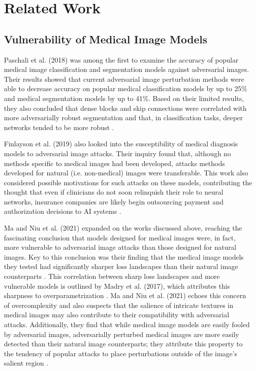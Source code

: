 \documentclass[10pt,twocolumn,letterpaper]{article}
\begin{document}
\section{Related Work}
  \subsection{Vulnerability of Medical Image Models}
    Paschali et al. (2018) was among the first to examine the accuracy of popular medical image classification and segmentation models against adversarial images. Their results showed that current adversarial image perturbation methods were able to decrease accuracy on popular medical classification models by up to 25\% and medical segmentation models by up to 41\%. Based on their limited results, they also concluded that dense blocks and skip connections were correlated with more adversarially robust segmentation and that, in classification tasks, deeper networks tended to be more robust \cite{Paschali}.

    Finlayson et al. (2019) also looked into the susceptibility of medical diagnosis models to adversarial image attacks. Their inquiry found that, although no methods specific to medical images had been developed, attacks methods developed for natural (i.e. non-medical) images were transferable. This work also considered possible motivations for such attacks on these models, contributing the thought that even if clinicians do not soon relinquish their role to neural networks, insurance companies are likely begin outsourcing payment and authorization decisions to AI systems \cite{Finlayson}.

    Ma and Niu et al. (2021) expanded on the works discussed above, reaching the fascinating conclusion that models designed for medical images were, in fact, more vulnerable to adversarial image attacks than those designed for natural images. Key to this conclusion was their finding that the medical image models they tested had significantly sharper loss landscapes than their natural image counterparts \cite{MaNiu}. This correlation between sharp loss landscapes and more vulnerable models is outlined by Madry et al. (2017), which attributes this sharpness to overparametrization \cite{Madry}. Ma and Niu et al. (2021) echoes this concern of overcomplexity and also suspects that the salience of intricate textures in medical images may also contribute to their compatibility with adversarial attacks. Additionally, they find that while medical image models are easily fooled by adversarial images, adversarially perturbed medical images are more easily detected than their natural image counterparts; they attribute this property to the tendency of popular attacks to place perturbations outside of the image's salient region \cite{MaNiu}.
\end{document}
